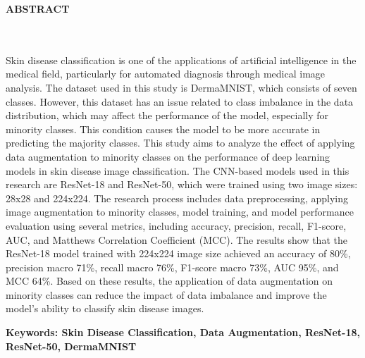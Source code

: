 \clearpage
{}%
\thispagestyle{fancy}

\begin{center}
	\large \bfseries \MakeUppercase{Abstract}\\
	\normalsize \normalfont {\thetitleEN}\\
	\normalsize \normalfont {\theauthor}\\
	\bigskip
	
	\normalsize \normalfont \justifying \singlespacing
	Skin disease classification is one of the applications of artificial 
	intelligence in the medical field, particularly for automated 
	diagnosis through medical image analysis. The dataset used in this 
	study is DermaMNIST, which consists of seven classes. However, this 
	dataset has an issue related to class imbalance in the data 
	distribution, which may affect the performance of the model, 
	especially for minority classes. This condition causes the model to be 
	more accurate in predicting the majority classes. This study aims to 
	analyze the effect of applying data augmentation to minority classes 
	on the performance of deep learning models in skin disease image 
	classification. The CNN-based models used in this research are 
	ResNet-18 and ResNet-50, which were trained using two image sizes: 28x28 and 224x224. 
	The research process includes data 
	preprocessing, applying image augmentation to minority classes, model 
	training, and model performance evaluation using several metrics, 
	including accuracy, precision, recall, F1-score, AUC, and Matthews 
	Correlation Coefficient (MCC). The results show that the ResNet-18 
	model trained with 224x224 image size achieved an accuracy of 80\%, 
	precision macro 71\%, recall macro 76\%, F1-score macro 73\%, 
	AUC 95\%, and MCC 64\%. Based on these results, the application 
	of data augmentation on minority classes can reduce the impact of data 
	imbalance and improve the model's ability to classify skin disease images.

    
    \vspace{20pt}
	\raggedright\textbf{Keywords: Skin Disease Classification, Data Augmentation, ResNet-18, ResNet-50, DermaMNIST}
	
	\vfill
	
\end{center}
\clearpage